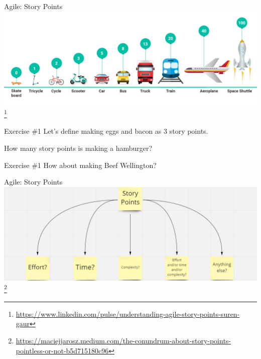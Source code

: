 \documentclass[aspectratio=169]{beamer}
\begin{document}
\begin{frame}{Agile: Story Points}
    \centering
    \includegraphics[width=\textwidth,height=0.8\textheight,keepaspectratio]{16_agile_story_points.jpg} \footnote{\url{https://www.linkedin.com/pulse/understanding-agile-story-points-suren-gaur}}
\end{frame}
\begin{frame}{Exercise \#1}
    Let's define making eggs and bacon as 3 story points.

    How many story points is making a hamburger?
\end{frame}
\begin{frame}{Exercise \#1}
    How about making Beef Wellington?
\end{frame}
\begin{frame}{Agile: Story Points}
    \centering
    \includegraphics[width=\textwidth,height=0.8\textheight,keepaspectratio]{16_story_points_meaningless.png} \footnote{\url{https://maciejjarosz.medium.com/the-conundrum-about-story-points-pointless-or-not-b5d715180c96}}
\end{frame}
\end{document}
